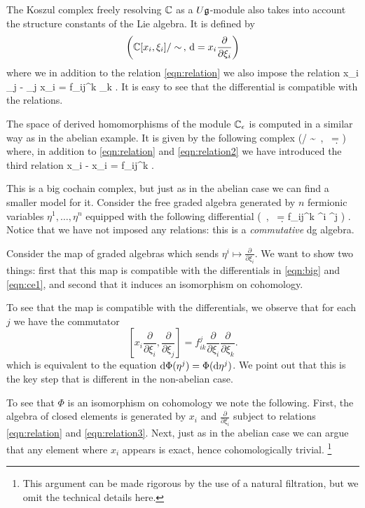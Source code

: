 \documentclass[11pt]{amsart}
\begin{document}
The Koszul complex freely resolving $\mathbb C$ as a $U \mathfrak g$-module also takes into account the structure constants of the Lie algebra. 
It is defined by
\[
\left(\mathbb C[x_i,\xi_i] / \sim \, , \,{\rm d} =  x_i \frac{\partial}{\partial \xi_i} \right) 
\]
where we in addition to the relation \eqref{eqn:relation} we also impose the relation
\beqn \label{eqn:relation2}
x_i \xi_j - \xi_j x_i = f_{ij}^k \xi_k .
\eeqn
It is easy to see that the differential is compatible with the relations.

The space of derived homomorphisms of the module $\mathbb C_\epsilon$ is computed in a similar way as in the abelian example. 
It is given by the following complex 
\beqn
\label{eqn:big}
\left(\CC{} / \sim \, , \, \d =  \right) 
\eeqn
where, in addition to \eqref{eqn:relation} and \eqref{eqn:relation2} we have introduced the third relation
\beqn \label{eqn:relation3}
x_i  -  x_i = f_{ij}^k  .
\eeqn

This is a big cochain complex, but just as in the abelian case we can find a smaller model for it.
Consider the free graded algebra generated by $n$ fermionic variables $\eta^1, \ldots, \eta^n$ equipped with the following differential
\beqn\label{eqn:ce1}
\left(\CC[\eta^i] \, , \, \d =  f_{ij}^k \eta^i \eta^j   \right) .
\eeqn
Notice that we have not imposed any relations: this is a {\em commutative} dg algebra.

Consider the map of graded algebras
\beqn\label{eqn:quasi1}
\Phi \colon \CC[\eta^i] \to \CC{}
\eeqn
which sends $\eta^i \mapsto  \frac{\partial}{\partial \xi_i}$. 
We want to show two things: first that this map is compatible with the differentials in \eqref{eqn:big} and \eqref{eqn:ce1}, and second that it induces an isomorphism on cohomology.

To see that the map is compatible with the differentials, we observe that for each $j$ we have the commutator
\[
\left[x_i \frac{\partial}{\partial \xi_i} , \frac{\partial}{\partial \xi_j}\right] = f^j_{ik} \frac{\partial}{\partial \xi_i} \frac{\partial}{\partial \xi_k} .
\]
which is equivalent to the equation ${\rm d} \Phi(\eta^j) =\Phi ({\rm d} \eta^j)$. 
We point out that this is the key step that is different in the non-abelian case. 

To see that $\Phi$ is an isomorphism on cohomology we note the following. 
First, the algebra of closed elements is generated by $x_i$ and $\frac{\partial}{\partial \xi_i}$ subject to relations \eqref{eqn:relation} and \eqref{eqn:relation3}.
Next, just as in the abelian case we can argue that any element where $x_i$ appears is exact, hence cohomologically trivial. 
\footnote{This argument can be made rigorous by the use of a natural filtration, but we omit the technical details here.}  
\end{document}
